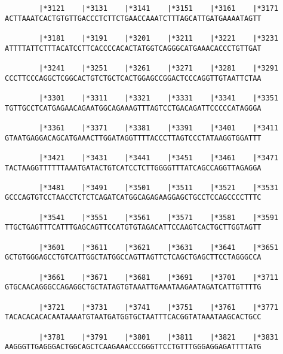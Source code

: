 \documentclass{article}
\begin{document}
\begin{Verbatim}
        |*3121    |*3131    |*3141    |*3151    |*3161    |*3171
ACTTAAATCACTGTGTTGACCCTCTTCTGAACCAAATCTTTAGCATTGATGAAAATAGTT
                                                            
        |*3181    |*3191    |*3201    |*3211    |*3221    |*3231
ATTTTATTCTTTACATCCTTCACCCCACACTATGGTCAGGGCATGAAACACCCTGTTGAT
                                                            
        |*3241    |*3251    |*3261    |*3271    |*3281    |*3291
CCCTTCCCAGGCTCGGCACTGTCTGCTCACTGGAGCCGGACTCCCAGGTTGTAATTCTAA
                                                            
        |*3301    |*3311    |*3321    |*3331    |*3341    |*3351
TGTTGCCTCATGAGAACAGAATGGCAGAAAGTTTAGTCCTGACAGATTCCCCCATAGGGA
                                                            
        |*3361    |*3371    |*3381    |*3391    |*3401    |*3411
GTAATGAGGACAGCATGAAACTTGGATAGGTTTTACCCTTAGTCCCTATAAGGTGGATTT
                                                            
        |*3421    |*3431    |*3441    |*3451    |*3461    |*3471
TACTAAGGTTTTTTAAATGATACTGTCATCCTCTTGGGGTTTATCAGCCAGGTTAGAGGA
                                                            
        |*3481    |*3491    |*3501    |*3511    |*3521    |*3531
GCCCAGTGTCCTAACCTCTCTCAGATCATGGCAGAGAAGGAGCTGCCTCCAGCCCCTTTC
                                                            
        |*3541    |*3551    |*3561    |*3571    |*3581    |*3591
TTGCTGAGTTTCATTTGAGCAGTTCCATGTGTAGACATTCCAAGTCACTGCTTGGTAGTT
                                                            
        |*3601    |*3611    |*3621    |*3631    |*3641    |*3651
GCTGTGGGAGCCTGTCATTGGCTATGGCCAGTTAGTTCTCAGCTGAGCTTCCTAGGGCCA
                                                            
        |*3661    |*3671    |*3681    |*3691    |*3701    |*3711
GTGCAACAGGGCCAGAGGCTGCTATAGTGTAAATTGAAATAAGAATAGATCATTGTTTTG
                                                            
        |*3721    |*3731    |*3741    |*3751    |*3761    |*3771
TACACACACACAATAAAATGTAATGATGGTGCTAATTTCACGGTATAAATAAGCACTGCC
                                                            
        |*3781    |*3791    |*3801    |*3811    |*3821    |*3831
AAGGGTTGAGGGACTGGCAGCTCAAGAAACCCGGGTTCCTGTTTGGGAGGAGATTTTATG
                                                            

\end{Verbatim}
\end{document}
